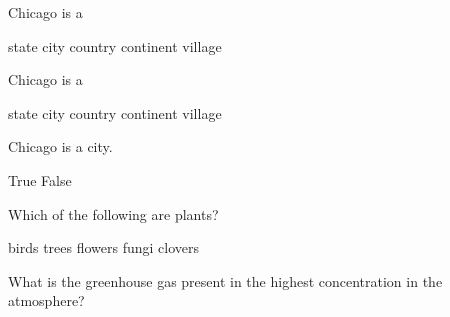 \documentclass[addpoints]{exam}
\begin{document}
\begin{questions}
\question[1\half] Chicago is a
\begin{choices}
    \choice state
    \correctchoice city
    \choice country
    \choice continent
    \choice village
\end{choices}

\question[1] Chicago is a

\begin{oneparchoices}
    \choice state
    \correctchoice city
    \choice country
    \choice continent
    \choice village
\end{oneparchoices}

\question[1] Chicago is a city. 

\begin{oneparchoices}
    \correctchoice True
    \choice False
\end{oneparchoices}

\question[1] Which of the following are plants?
\begin{checkboxes}
    \choice birds
    \correctchoice trees
    \correctchoice flowers
    \choice fungi
    \correctchoice clovers
\end{checkboxes}
\question[1] What is the greenhouse gas present in the highest concentration in the atmosphere? 



\end{questions}
\end{document}
